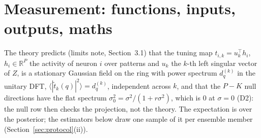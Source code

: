 \documentclass[11pt,a4paper]{article}
\newcommand{\R}{\mathbb R}
\begin{document}
\section{Measurement: functions, inputs, outputs, maths}
\label{sec:measure}
The theory predicts (limits note, Section~3.1) that the tuning map $t_{i,k} = u_k^\top h_i$, $h_i\in\R^P$ the activity of neuron $i$ over patterns and $u_k$ the $k$-th left singular vector of $Z$, is a stationary Gaussian field on the ring with power spectrum $d^{(k)}_q$ in the unitary DFT, $\langle|\tilde t_k(q)|^2\rangle = d^{(k)}_q$, independent across $k$, and that the $P - K$ null directions have the flat spectrum $\sigma_0^2 = \sigma^2/(1 + r\sigma^2)$, which is $0$ at $\sigma = 0$ (D2): the null row then checks the projection, not the theory. The expectation is over the posterior; the estimators below draw one sample of it per ensemble member (Section~\ref{sec:protocol}(ii)).
\end{document}
